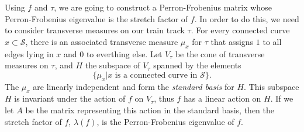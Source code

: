 Using $f$ and $\tau$, we are going to construct a Perron-Frobenius matrix whose Perron-Frobenius eigenvalue is the stretch factor of $f$. In order to do this, we need to consider transverse measures on our train track $\tau$. For every connected curve $x \subset \mathcal{S}$, there is an associated transverse measure $\mu_x$ for $\tau$ that assigns $1$ to all edges lying in $x$ and 0 to everthing else. Let $V_\tau$ be the cone of transverse measures on $\tau$, and $H$ the subspace of $V_\tau$ spanned by the elements $$\{\mu_x \vert x \text{ is a connected curve in } \mathcal{S}\}.$$ The $\mu_x$ are linearly independent and form the \textit{standard basis} for $H$. This subspace $H$ is invariant under the action of $f$ on $V_\tau$, thus $f$ has a linear action on $H$. If we let $A$ be the matrix representing this action in the standard basis, then the stretch factor of $f$, $\lambda(f)$, is the Perron-Frobenius eigenvalue of $f$.
